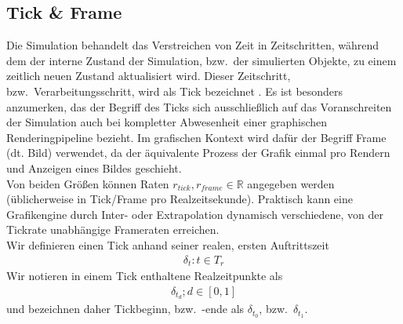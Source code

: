 \subsection{Tick \& Frame}
\label{sec:tick}
Die Simulation behandelt das Verstreichen von Zeit in Zeitschritten, während dem der interne Zustand der Simulation, bzw.~der simulierten Objekte, zu einem zeitlich neuen Zustand aktualisiert wird.
Dieser Zeitschritt, bzw.~Verarbeitungsschritt, wird als Tick bezeichnet \cite{tick}.
Es ist besonders anzumerken, das der Begriff des Ticks sich ausschließlich auf das Voranschreiten der Simulation auch bei kompletter Abwesenheit einer graphischen Renderingpipeline bezieht. Im grafischen Kontext wird dafür der Begriff Frame (dt. Bild) verwendet, da der äquivalente Prozess der Grafik einmal pro Rendern und Anzeigen eines Bildes geschieht.\\
Von beiden Größen können Raten $r_{tick}, r_{frame} \in \mathbb{R}$ angegeben werden (üblicherweise in Tick/Frame pro Realzeitsekunde). Praktisch kann eine Grafikengine durch Inter- oder Extrapolation dynamisch verschiedene, von der Tickrate unabhängige Frameraten erreichen.\\
Wir definieren einen Tick anhand seiner realen, ersten Auftrittszeit
\begin{align}
\delta_t: t \in T_r
\end{align}
Wir notieren in einem Tick enthaltene Realzeitpunkte als
\begin{align}\label{m:tickinterval}
\delta_{t_d}; d \in [0,1]
\end{align}
und bezeichnen daher Tickbeginn, bzw.~-ende als $\delta_{t_0}$, bzw.~$\delta_{t_1}$. 

